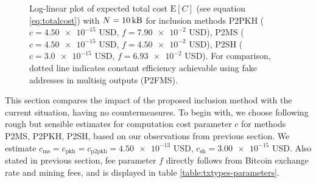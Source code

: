 \documentclass[a4paper,11pt,titlepage]{scrbook}
\begin{document}
\begin{figure}[tb]
    \centering
    \caption[Log-linear plot of expected total cost]{Log-linear plot of expected total cost $\mathrm{E}[C]$ (see equation \ref{eq:totalcost}) with $N=\protect\SI{10}{\kilo\byte}$ for inclusion methods P2PKH ($c=\num{4.50e-15}$ USD, $f=\num{7.90e-2}$ USD), P2MS ($c=\num{4.50e-15}$ USD, $f=\num{4.50e-2}$ USD), P2SH ($c=\num{3.0e-15}$ USD, $f=\num{6.93e-2}$ USD). For comparison, dotted line indicates constant efficiency achievable using fake addresses in multisig outputs (P2FMS).}
    \label{fig:plot}
\end{figure}

This section compares the impact of the proposed inclusion method with the current situation, having no countermeasures.
To begin with, we choose following rough but sensible estimates for computation cost parameter $c$ for methods P2MS, P2PKH, P2SH, based on our observations from previous section.
We estimate $c_\text{ms}=c_\text{pkh}=c_\text{p2pkh}=\num{4.50e-13}$ USD, $c_\text{sh} = \num{3.00e-15}$ USD.
Also stated in previous section, fee parameter $f$ directly follows from Bitcoin exchange rate and mining fees, and is displayed in table \ref{table:txtypes-parameters}.
\end{document}
